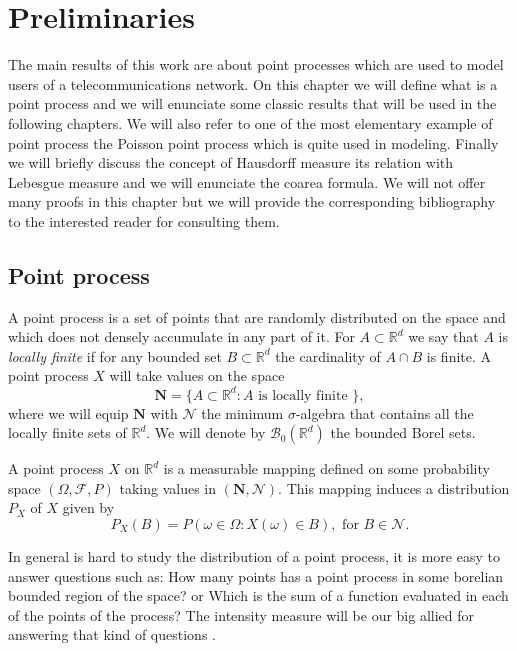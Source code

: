 \chapter{Preliminaries}
The main results of this work are about point processes which are used to model users of a telecommunications network. On this chapter we will define what is a point process and we will enunciate some classic results that will be used in the following chapters. We will also refer to one of the most elementary example of point process the Poisson point process which is quite used in modeling. Finally we will briefly discuss the concept of Hausdorff measure its relation with Lebesgue measure and we will enunciate the coarea formula. We will not offer many proofs in this chapter but we will provide the corresponding bibliography to the interested reader for consulting them.

\section{Point process}

A point process is a set of points that are randomly distributed on the space and which does not densely accumulate in any part of it. For $A\subset \mathbb{R}^d$ we say that $A$ is \textit{locally finite} if for any bounded set $B\subset \mathbb{R}^d$ the cardinality of $A\cap B $ is finite. A point process $X$ will take values on the space
$$\textbf{N}=\lbrace A\subset \mathbb{R}^d: A\mbox{ is locally finite }\rbrace, $$ where we will equip $\textbf{N}$ with $\mathcal{N}$ the minimum $\sigma$-algebra that contains all the locally finite sets of $\mathbb{R}^d$. We will denote by $\mathcal{B}_0(\mathbb{R}^d)$ the bounded Borel sets.

\begin{defn} A point process $X$ on $\mathbb{R}^d$ is a measurable mapping defined on some probability space $(\Omega, \mathcal{F}, P)$ taking values in $(\textbf{N}, \mathcal{N})$. This mapping induces a distribution $P_X$ of $X$ given by 
$$P_X(B)=P(\omega\in\Omega:X(\omega)\in B),\mbox{ for }B\in \mathcal{N}.$$
\end{defn}

In general is hard to study the distribution of a point process, it is more easy to answer questions such as: How many points has a point process in some borelian bounded region of the space? or Which is the sum of a function evaluated in each of the points of the process? The intensity measure will be our big allied for answering that kind of questions .

